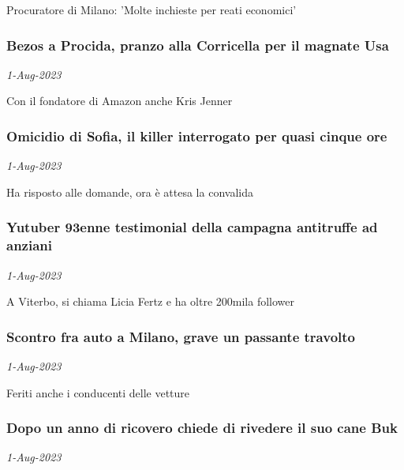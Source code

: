 Procuratore di Milano: 'Molte inchieste per reati economici'
\subsubsection{Bezos a Procida, pranzo alla Corricella per il magnate Usa \href{https://www.ansa.it/sito/notizie/cronaca/2023/08/01/bezos-a-procida-pranzo-alla-corricella-per-il-magnate-usa_05d8ea35-905d-4e8d-b0a7-8fc9286e8e13.html}{}}
\textit{1-Aug-2023}

Con il fondatore di Amazon anche Kris Jenner
\subsubsection{Omicidio di Sofia, il killer interrogato per quasi cinque ore \href{https://www.ansa.it/sito/notizie/cronaca/2023/08/01/omicidio-di-sofia-il-killer-interrogato-per-quasi-cinque-ore_f76263e5-e520-460d-a697-c0ba8cf461a0.html}{}}
\textit{1-Aug-2023}

Ha risposto alle domande, ora \`{e} attesa la convalida
\subsubsection{Yutuber 93enne testimonial della campagna antitruffe ad anziani \href{https://www.ansa.it/sito/notizie/cronaca/2023/08/01/yutuber-93enne-testimonial-della-campagna-antitruffe-ad-anziani_9f15635f-7191-4283-af5f-735efda7c182.html}{}}
\textit{1-Aug-2023}

A Viterbo, si chiama Licia Fertz e ha oltre 200mila follower
\subsubsection{Scontro fra auto a Milano, grave un passante travolto \href{https://www.ansa.it/sito/notizie/cronaca/2023/08/01/scontro-fra-auto-a-milano-grave-un-passante-travolto_a675aee9-92e4-4398-9b5d-3e39e1330dea.html}{}}
\textit{1-Aug-2023}

Feriti anche i conducenti delle vetture
\subsubsection{Dopo un anno di ricovero chiede di rivedere il suo cane Buk \href{https://www.ansa.it/sito/notizie/cronaca/2023/08/01/dopo-un-anno-di-ricovero-chiede-di-rivedere-il-suo-cane-buk_7441a532-0c67-4fda-abe0-45b81df9f588.html}{}}
\textit{1-Aug-2023}

